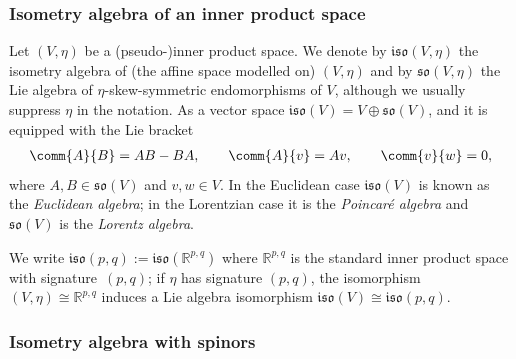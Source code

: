 \documentclass[pdftex]{sigma}
\numberwithin{equation}{section}
\newcommand{\fso}{\mathfrak{so}}
\newcommand{\fiso}{\mathfrak{iso}}
\newcommand{\RR}{\mathbb{R}}
\newcommand{\1}{\mathbbm{1}}
\begin{document}
\subsubsection{Isometry algebra of an inner product space}

Let $(V,\eta)$ be a (pseudo-)inner product space. We denote by $\fiso(V,\eta)$ the isometry algebra of (the affine space modelled on) $(V,\eta)$ and by $\fso(V,\eta)$ the Lie algebra of $\eta$-skew-symmetric endomorphisms of $V$, although we usually suppress $\eta$ in the notation. As a vector space $\fiso(V)=V\oplus\fso(V)$, and it is equipped with the Lie bracket
\begin{align}\label{eq:flat-bracket}
 \comm{A}{B} = AB - BA,\qquad
 \comm{A}{v} = Av,\qquad
\comm{v}{w} = 0,
\end{align}
where $A,B\in\fso(V)$ and $v,w\in V$. In the Euclidean case $\fiso(V)$ is known as the \emph{Euclidean algebra}; in the Lorentzian case it is the \emph{Poincar\'e algebra} and $\fso(V)$ is the \emph{Lorentz algebra}.

We write $\fiso(p,q):=\fiso(\RR^{p,q})$ where $\RR^{p,q}$ is the standard inner product space with signature~$(p,q)$; if $\eta$ has signature $(p,q)$, the isomorphism $(V,\eta)\cong\RR^{p,q}$ induces a Lie algebra isomorphism $\fiso(V)\cong\fiso(p,q)$.

\subsubsection{Isometry algebra with spinors}
\label{sec:isom-alg-spinors}
\end{document}
